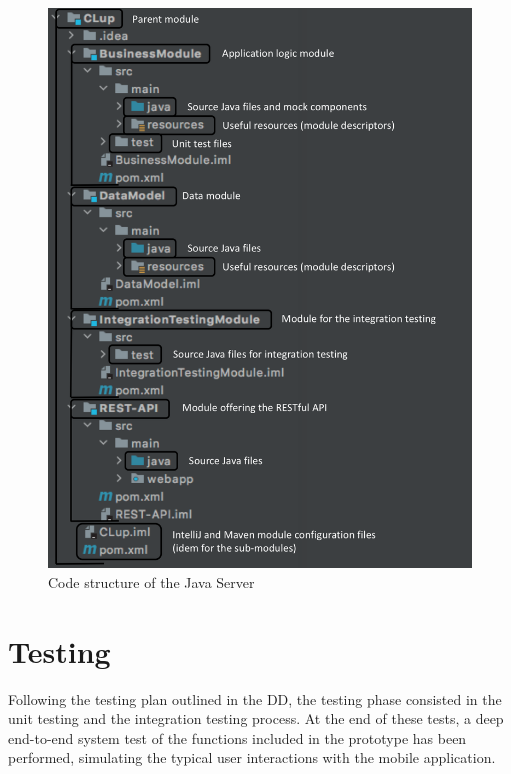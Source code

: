 \documentclass[a4paper,oneside,11pt]{book}
\begin{document}
    \begin{figure}[H]
        \centering
        \includegraphics[width=.8\textwidth, height=\textheight, keepaspectratio]{pictures/codestructure_java.png}
        \caption{Code structure of the Java Server}
        \label{figure:codestructure_java}
    \end{figure}
    

\chapter{Testing}
    Following the testing plan outlined in the DD,  the testing phase consisted in the unit testing and the integration testing process. At the end of these tests, a deep end-to-end system test of the functions included in the prototype has been performed, simulating the typical user interactions with the mobile application.
    
\end{document}
